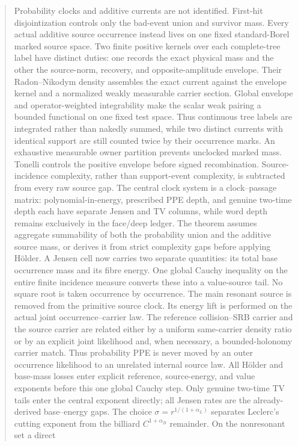 \documentclass[11pt]{article}
\begin{document}
\begin{abstract}
Probability clocks and additive currents are not identified.  First-hit
disjointization controls only the bad-event union and survivor mass.  Every
actual additive source occurrence instead lives on one fixed standard-Borel
marked source space.  Two finite positive kernels over each complete-tree
label have distinct duties: one records the exact physical mass and the
other the source-norm, recovery, and opposite-amplitude envelope.  Their
Radon--Nikodym density assembles the exact current against the envelope
kernel and a normalized weakly measurable carrier section.  Global envelope
and operator-weighted integrability make the scalar weak pairing a bounded
functional on one fixed test space.  Thus continuous tree labels are
integrated rather than nakedly summed, while two distinct currents with
identical support are still counted twice by their occurrence marks.  An
exhaustive measurable owner partition prevents unclocked marked mass.
Tonelli controls the positive envelope before signed recombination.  Source-incidence
complexity, rather than support-event complexity, is subtracted from every
raw source gap.  The central clock system is a clock--passage matrix:
polynomial-in-energy, prescribed PPE depth, and genuine two-time depth each
have separate Jensen and TV columns, while word depth remains exclusively in
the face/deep ledger.  The theorem assumes aggregate summability of both the
probability union and the additive source mass, or derives it from strict
complexity gaps before applying H\"older.  A Jensen cell now carries two
separate quantities: its total base occurrence mass and its fibre energy.
One global Cauchy inequality on the entire finite incidence measure converts
these into a value-source tail.  No square root is taken occurrence by
occurrence.  The main resonant source is removed from the primitive source
clock.  Its energy lift is performed on the actual joint
occurrence--carrier law.  The reference collision--SRB carrier and the source
carrier are related either by a uniform same-carrier density ratio or by an
explicit joint likelihood and, when necessary, a bounded-holonomy carrier
match.  Thus probability PPE is never moved by an outer occurrence
likelihood to an unrelated internal source law.  All H\"older and base-mass
losses enter explicit reference, source-energy, and value exponents before
this one global Cauchy step.  Only genuine
two-time TV tails enter the central exponent directly; all Jensen rates are
the already-derived base--energy gaps.  The
choice $\sigma=r^{1/(1+\alpha_L)}$ separates Leclerc's cutting exponent from
the billiard $C^{1+\alpha_B}$ remainder.  On the nonresonant set a direct

\end{abstract}
\end{document}
